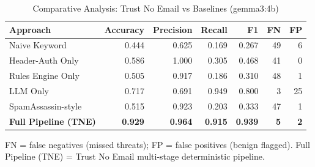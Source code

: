 \begin{table}[h]
\centering
\caption{Comparative Analysis: Trust No Email vs Baselines (gemma3:4b)}
\label{tab:e10_comparative}
\begin{tabular}{l r r r r r r}
\hline
Approach & Accuracy & Precision & Recall & F1 & FN & FP \\
\hline
Naive Keyword & 0.444 & 0.625 & 0.169 & 0.267 & 49 & 6 \\
Header-Auth Only & 0.586 & 1.000 & 0.305 & 0.468 & 41 & 0 \\
Rules Engine Only & 0.505 & 0.917 & 0.186 & 0.310 & 48 & 1 \\
LLM Only & 0.717 & 0.691 & 0.949 & 0.800 & 3 & 25 \\
SpamAssassin-style & 0.515 & 0.923 & 0.203 & 0.333 & 47 & 1 \\
\textbf{Full Pipeline (TNE)} & \textbf{0.929} & \textbf{0.964} & \textbf{0.915} & \textbf{0.939} & \textbf{5} & \textbf{2} \\
\hline
\end{tabular}
\vspace{2mm}
\footnotesize{FN = false negatives (missed threats); FP = false positives (benign flagged). Full Pipeline (TNE) = Trust No Email multi-stage deterministic pipeline.}
\end{table}